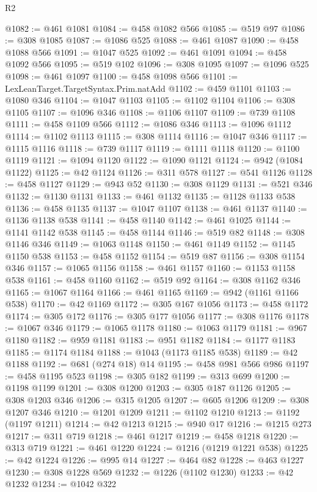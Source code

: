 \begin{lexlean}{R2}
\begin{coremodule}
@1082 := @461 @1081
@1084 := @458 @1082 @566
@1085 := @519 @97
@1086 := @308 @1085
@1087 := @1086 @525
@1088 := @461 @1087
@1090 := @458 @1088 @566
@1091 := @1047 @525
@1092 := @461 @1091
@1094 := @458 @1092 @566
@1095 := @519 @102
@1096 := @308 @1095
@1097 := @1096 @525
@1098 := @461 @1097
@1100 := @458 @1098 @566
@1101 := LexLeanTarget.TargetSyntax.Prim.natAdd
@1102 := @459 @1101
@1103 := @1080 @346
@1104 := @1047 @1103
@1105 := @1102 @1104
@1106 := @308 @1105
@1107 := @1096 @346
@1108 := @1106 @1107
@1109 := @739 @1108
@1111 := @458 @1109 @566
@1112 := @1086 @346
@1113 := @1096 @1112
@1114 := @1102 @1113
@1115 := @308 @1114
@1116 := @1047 @346
@1117 := @1115 @1116
@1118 := @739 @1117
@1119 := @1111 @1118
@1120 := @1100 @1119
@1121 := @1094 @1120
@1122 := @1090 @1121
@1124 := @942 (@1084 @1122)
@1125 := @42 @1124
@1126 := @311 @578
@1127 := @541 @1126
@1128 := @458 @1127
@1129 := @943 @52
@1130 := @308 @1129
@1131 := @521 @346
@1132 := @1130 @1131
@1133 := @461 @1132
@1135 := @1128 @1133 @538
@1136 := @458 @1135
@1137 := @1047 @1107
@1138 := @461 @1137
@1140 := @1136 @1138 @538
@1141 := @458 @1140
@1142 := @461 @1025
@1144 := @1141 @1142 @538
@1145 := @458 @1144
@1146 := @519 @82
@1148 := @308 @1146 @346
@1149 := @1063 @1148
@1150 := @461 @1149
@1152 := @1145 @1150 @538
@1153 := @458 @1152
@1154 := @519 @87
@1156 := @308 @1154 @346
@1157 := @1065 @1156
@1158 := @461 @1157
@1160 := @1153 @1158 @538
@1161 := @458 @1160
@1162 := @519 @92
@1164 := @308 @1162 @346
@1165 := @1067 @1164
@1166 := @461 @1165
@1169 := @942 (@1161 @1166 @538)
@1170 := @42 @1169
@1172 := @305 @167 @1056
@1173 := @458 @1172
@1174 := @305 @172
@1176 := @305 @177 @1056
@1177 := @308 @1176
@1178 := @1067 @346
@1179 := @1065 @1178
@1180 := @1063 @1179
@1181 := @967 @1180
@1182 := @959 @1181
@1183 := @951 @1182
@1184 := @1177 @1183
@1185 := @1174 @1184
@1188 := @1043 (@1173 @1185 @538)
@1189 := @42 @1188
@1192 := @681 (@274 @18) @14
@1195 := @458 @981 @566 @986
@1197 := @458 @1195 @523
@1198 := @305 @182
@1199 := @313 @699
@1200 := @1198 @1199
@1201 := @308 @1200
@1203 := @305 @187 @1126
@1205 := @308 @1203 @346
@1206 := @315 @1205
@1207 := @605 @1206
@1209 := @308 @1207 @346
@1210 := @1201 @1209
@1211 := @1102 @1210
@1213 := @1192 (@1197 @1211)
@1214 := @42 @1213
@1215 := @940 @17
@1216 := @1215 @273
@1217 := @311 @719
@1218 := @461 @1217
@1219 := @458 @1218
@1220 := @313 @719
@1221 := @461 @1220
@1224 := @1216 (@1219 @1221 @538)
@1225 := @42 @1224
@1226 := @995 @14
@1227 := @464 @82
@1228 := @463 @1227
@1230 := @308 @1228 @569
@1232 := @1226 (@1102 @1230)
@1233 := @42 @1232
@1234 := @1042 @322

\end{coremodule}
\end{lexlean}
